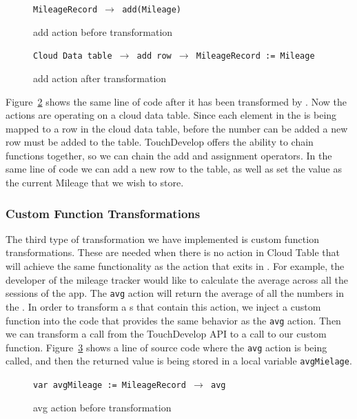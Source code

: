 \documentclass{sigplanconf}
\begin{document}
\begin{figure}[htbp!]
\begin{center}
\texttt{MileageRecord $\rightarrow$ add(Mileage)}
\nocaptionrule
\caption{add action before transformation}
\label{fig:numCol_Add}
\end{center}
\end{figure}
\begin{figure}[htbp!]
\begin{center}
\texttt{Cloud Data table $\rightarrow$ add row $\rightarrow$ MileageRecord := Mileage}
\nocaptionrule
\caption{add action after transformation}
\label{fig:CloudTable_Add}
\end{center}
\end{figure}

Figure~\ref{fig:CloudTable_Add} shows the same line of code after it has been transformed by  \tool.  Now the actions are operating on a cloud data table.  Since each element in the \NC{} is being mapped to a row in the cloud data table, before the number can be added a new row must be added to the table.  TouchDevelop offers the ability to chain functions together, so we can chain the add and assignment operators.  In the same line of code we can add a new row to the table, as well as set the value as the current Mileage that we wish to store.


\subsubsection{Custom Function Transformations}
The third type of transformation we have implemented is custom function transformations.  These are needed when there is no action in Cloud Table that will achieve the same functionality as the action that exits in  \NC{}. For example, the developer of the mileage tracker would like to calculate the average across all the sessions of the app.  The \texttt{avg} action will return the average of all the numbers in the \NC{}.  In order to transform a \NC{}s that contain this action, we inject a custom function into the code that provides the same behavior as the \texttt{avg} action.  Then we can transform a call from the TouchDevelop API to a call to our custom function.  Figure~\ref{fig:numCol_avg} shows a line of source code where the \texttt{avg} action is being called, and then the returned value is being stored in a local variable \texttt{avgMielage}.


\begin{figure}[htbp!]
\begin{center}
\texttt{var avgMileage := MileageRecord $\rightarrow$ avg}
\nocaptionrule
\caption{avg action before transformation}
\label{fig:numCol_avg}
\end{center}
\end{figure}
\end{document}
